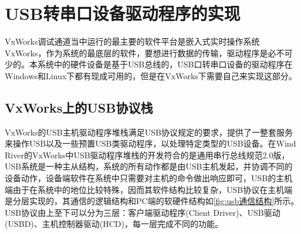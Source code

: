 \section{USB转串口设备驱动程序的实现}
	VxWorks调试通道当中运行的最主要的软件平台是嵌入式实时操作系统VxWorks，作为系统的最底层的软件，要想进行数据的传输，驱动程序是必不可少的。本系统中的硬件设备是基于USB总线的，USB口转串口设备的驱动程序在Windows和Linux下都有现成可用的，但是在VxWorks下需要自己来实现这部分。
	
\subsection{VxWorks上的USB协议栈}
	VxWorks的USB主机驱动程序堆栈满足USB协议规定的要求，提供了一整套服务来操作USB以及一些预置USB类驱动程序，以处理特定类型的USB设备。在Wind River的VxWorks中USB驱动程序堆栈的开发符合的是通用串行总线规范2.0版，USB系统是一种主从结构，系统的所有动作都是由USB主机发起，并协调不同的设备动作，设备端软件在系统中只需要对主机的命令做出响应即可，USB的主机端由于在系统中的地位比较特殊，因而其软件结构比较复杂，USB协议在主机端是分层实现的，其通信的逻辑结构和PC端的软硬件结构如\autoref{fig:usb通信结构}所示。USB协议由上至下可以分为三层：客户端驱动程序(Client Driver)、USB驱动(USBD)、主机控制器驱动(HCD)，每一层完成不同的功能。

